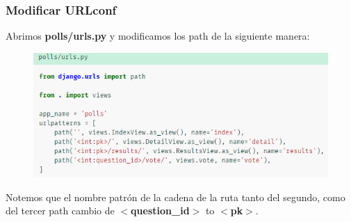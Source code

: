 \documentclass[10pt]{article}
\begin{document}
\subsubsection*{Modificar URLconf}
Abrimos \textbf{polls/urls.py} y modificamos los path de la siguiente manera:
\begin{figure}[H]
\begin{center}
\includegraphics[scale=1]{figuras/3/34/342/img1.png}
\end{center}
\end{figure}
Notemos que el nombre patrón de la cadena de la ruta tanto del segundo, como del tercer path cambio de \textbf{$<$question\_id$>$} to \textbf{$<$pk$>$}. 
\end{document}
